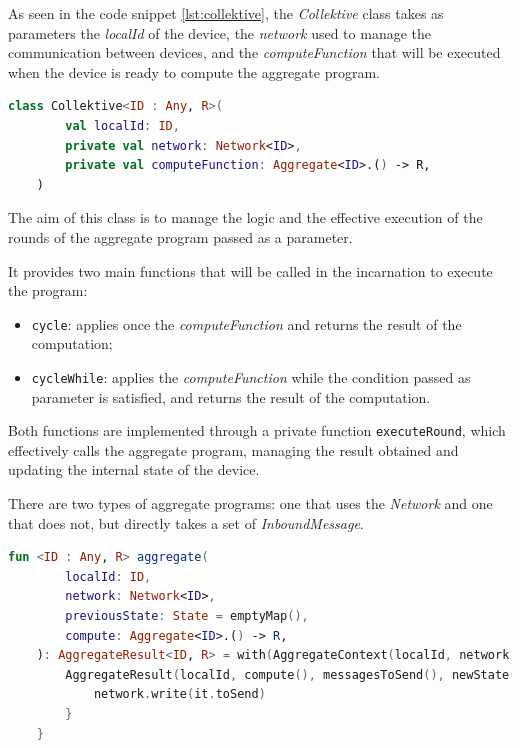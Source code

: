 As seen in the code snippet \ref{lst:collektive}, the \emph{Collektive} class takes as parameters the \emph{localId} of the device,
the \emph{network} used to manage the communication between devices, and the \emph{computeFunction} that will be executed
when the device is ready to compute the aggregate program.

\begin{minipage}{\linewidth}
    \begin{lstlisting}[language=kt,label={lst:collektive}, caption={The signature of the \texttt{Collektive} class.}]
    class Collektive<ID : Any, R>(
        val localId: ID,
        private val network: Network<ID>,
        private val computeFunction: Aggregate<ID>.() -> R,
    )
    \end{lstlisting}
\end{minipage}

The aim of this class is to manage the logic and the effective execution of the rounds of the aggregate program passed as a parameter.

It provides two main functions that will be called in the incarnation to execute the program:
\begin{itemize}
    \item \texttt{cycle}: applies once the \emph{computeFunction} and returns the result of the computation;
    \item \texttt{cycleWhile}: applies the \emph{computeFunction} while the condition passed as parameter is satisfied,
        and returns the result of the computation.
\end{itemize}

Both functions are implemented through a private function \texttt{executeRound}, which effectively calls the aggregate program,
managing the result obtained and updating the internal state of the device.

There are two types of aggregate programs: one that uses the \emph{Network} and one that does not, but directly takes
a set of \emph{InboundMessage}.

\begin{lstlisting}[language=kt,label={lst:aggregate}, caption={The signature of the \texttt{aggregate program}.}]
fun <ID : Any, R> aggregate(
        localId: ID,
        network: Network<ID>,
        previousState: State = emptyMap(),
        compute: Aggregate<ID>.() -> R,
    ): AggregateResult<ID, R> = with(AggregateContext(localId, network.read(), previousState)) {
        AggregateResult(localId, compute(), messagesToSend(), newState()).also {
            network.write(it.toSend)
        }
    }
\end{lstlisting}

